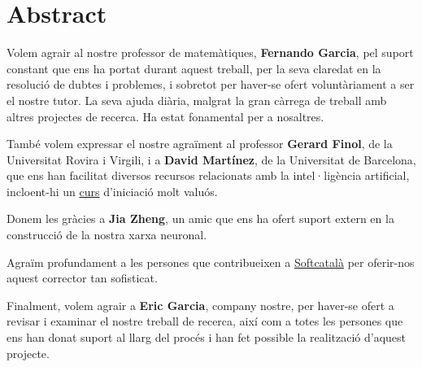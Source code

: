 \chapter*{Abstract}
Volem agrair al nostre professor de matemàtiques, \textbf{Fernando Garcia}, pel suport constant que ens ha portat durant aquest treball, per la seva claredat en la resolució de dubtes i problemes, i sobretot per haver-se ofert voluntàriament a ser el nostre tutor. La seva ajuda diària, malgrat la gran càrrega de treball amb altres projectes de recerca. Ha estat fonamental per a nosaltres.\par

També volem expressar el nostre agraïment al professor \textbf{Gerard Finol}, de la Universitat Rovira i Virgili, i a \textbf{David Martínez}, de la Universitat de Barcelona, que ens han facilitat diversos recursos relacionats amb la intel·ligència artificial, incloent-hi un \href{https://www.coursera.org/specializations/deep-learning#courses}{curs} d’iniciació molt valuós.

Donem les gràcies a \textbf{Jia Zheng}, un amic que ens ha ofert suport extern en la construcció de la nostra xarxa neuronal.\par

Agraïm profundament a les persones que contribueixen a \href{https://www.softcatala.org/corrector/}{Softcatalà} per oferir-nos aquest corrector tan sofisticat.

Finalment, volem agrair a \textbf{Eric Garcia}, company nostre, per haver-se ofert a revisar i examinar el nostre treball de recerca, així com a totes les persones que ens han donat suport al llarg del procés i han fet possible la realització d’aquest projecte.
